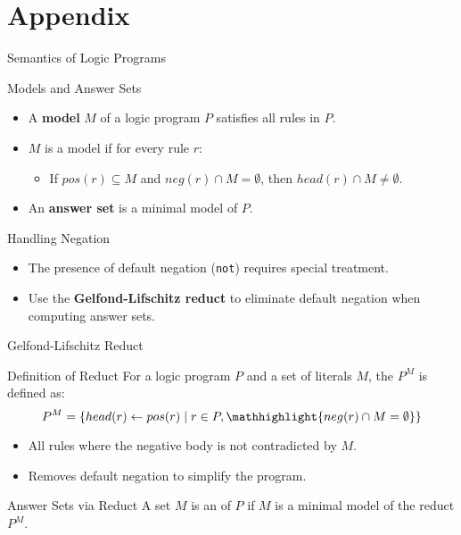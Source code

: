 \section{Appendix}

\begin{frame}{Semantics of Logic Programs}
    \begin{block}{Models and Answer Sets}
        \begin{itemize}
            \item A \textbf{model} \(M\) of a logic program \(P\) satisfies all rules in \(P\).
            \item \(M\) is a model if for every rule \(r\):
                  \begin{itemize}
                      \item If \(pos(r) \subseteq M\) and \(neg(r) \cap M = \emptyset\), then \(head(r) \cap M \neq \emptyset\).
                  \end{itemize}
            \item An \textbf{answer set} is a minimal model of \(P\).
        \end{itemize}
    \end{block}
    \begin{block}{Handling Negation}
        \begin{itemize}
            \item The presence of default negation (\texttt{not}) requires special treatment.
            \item Use the \textbf{Gelfond-Lifschitz reduct} to eliminate default negation when computing answer sets.
        \end{itemize}
    \end{block}
\end{frame}

\begin{frame}{Gelfond-Lifschitz Reduct}
    \begin{block}{Definition of Reduct}
        For a logic program \(P\) and a set of literals \(M\), the  \(P^M\) is defined as:
        \[
            P^M = \{head(r) \leftarrow pos(r) \mid r \in P, \mathhighlight{neg(r) \cap M = \emptyset}\}
        \]
        \begin{itemize}
            \item All rules where the negative body is not contradicted by \(M\).
            \item Removes default negation to simplify the program.
        \end{itemize}
    \end{block}
    \begin{block}{Answer Sets via Reduct}
        A set \(M\) is an  of \(P\) if \(M\) is a minimal model of the reduct \(P^M\).
    \end{block}
\end{frame}

